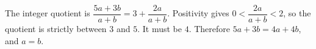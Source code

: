 The integer quotient is $\dfrac{5a+3b}{a+b}=3+\dfrac{2a}{a+b}$. Positivity gives $0<\dfrac{2a}{a+b}<2$, so the quotient is strictly between $3$ and $5$. It must be $4$. Therefore $5a+3b=4a+4b$, and $a=b$.
